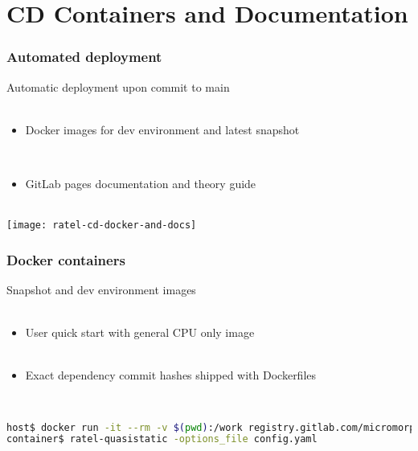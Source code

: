 \documentclass{beamer}
\begin{document}
\section{CD Containers and Documentation}

\begin{frame}
\begin{center}
\frametitle{Automated deployment}

Automatic deployment upon commit to main\\

~\\

\begin{itemize}

\item Docker images for dev environment and latest snapshot

~\\

\item GitLab pages documentation and theory guide

\end{itemize}

~\\

\texttt{[image: ratel-cd-docker-and-docs]}

\end{center}
\end{frame}


\begin{frame}[fragile]
\begin{center}
\frametitle{Docker containers}

Snapshot and dev environment images\\

~\\

\begin{itemize}

\item User quick start with general CPU only image\\

~\\

\item Exact dependency commit hashes shipped with Dockerfiles\\

\end{itemize}

~\\

\begin{lstlisting}[language=bash, basicstyle=\ttfamily\scriptsize]
host$ docker run -it --rm -v $(pwd):/work registry.gitlab.com/micromorph/ratel
container$ ratel-quasistatic -options_file config.yaml
\end{lstlisting}

\end{center}
\end{frame}
\end{document}
